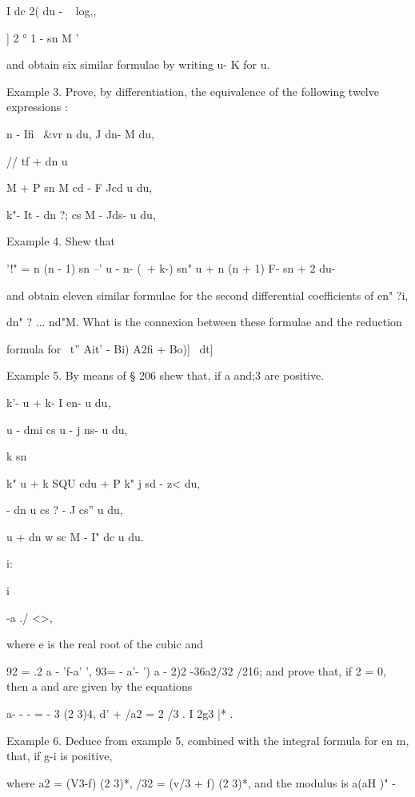 I dc 2( du - ~ log,,

] 2 ° 1 - sn M '

and obtain six similar formulae by writing u- K for u.


Example 3. Prove, by differentiation, the equivalence of the following
twelve expressions :

n - Ifi \ \&vr n du, J dn- M du,

// tf + dn u%

M + P sn M cd - F Jcd u du,

k"- It - dn ?; cs M - Jds- u du,

Example 4. Shew that

'!" = n (n - 1) sn --' u - n- (\ + k-) sn" u + n (n + 1) F- sn + 2 du-

and obtain eleven similar formulae for the second differential
coefficients of en" ?i,

dn" ? ... nd"M. What is the connexion between these formulae and the
reduction

formula for \ t'' Ait' - Bi) A2fi + Bo)]~ dt]


Example 5. By means of § 206 shew that, if a and;3 are positive.

k'- u + k- I en- u du,

u - dmi cs u - j ns- u du,

k sn %

k" u + k SQU cdu + P k" j sd - z< du,

- dn u cs ? - J cs'' u du,

u + dn w sc M - I" dc u du.

i:

 i

-a ./ <>,

where e is the real root of the cubic and

92 = .2 a - 'f-a' ', 93= - a'- ') a - 2)2 -36a2/32 /216; and prove
that, if 2 = 0, then a and are given by the equations

a- - - = - 3 (2 3)4, d' + /a2 = 2 /3 . I 2g3 |* .

%
%

Example 6. Deduce from example 5, combined with the integral formula
for en m, that, if g-i is positive,

where a2 = (V3-f) (2 3)*, /32 = (v/3 + f) (2 3)*, and the modulus is
a(aH )" -

